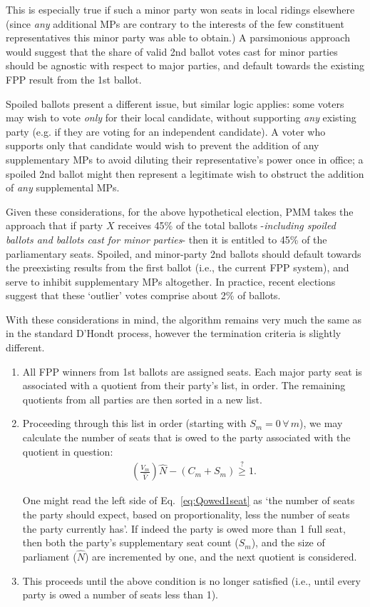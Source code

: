 This is especially true if such a minor party won seats in local ridings elsewhere (since \emph{any} additional MPs are contrary to the interests of the few constituent representatives this minor party was able to obtain.) 
A parsimonious approach would suggest that the share of valid 2nd ballot votes cast for minor parties should be agnostic with respect to major parties, and default towards the existing FPP result from the 1st ballot. 

Spoiled ballots present a different issue, but similar logic applies: some voters may wish to vote \emph{only} for their local candidate, without supporting \emph{any} existing party (e.g. if they are voting for an independent candidate). 
A voter who supports only that candidate would wish to prevent the addition of any supplementary MPs to avoid diluting their representative's power once in office; a spoiled 2nd ballot might then represent a legitimate wish to obstruct the addition of \emph{any} supplemental MPs.

Given these considerations, for the above hypothetical election, PMM takes the approach that if party $X$ receives 45\% of the total ballots \--\emph{including spoiled ballots and ballots cast for minor parties}\-- then it is entitled to 45\% of the parliamentary seats. 
Spoiled, and minor-party 2nd ballots should default towards the preexisting results from the first ballot (i.e., the current FPP system), and serve to inhibit supplementary MPs altogether. 
In practice, recent elections suggest that these `outlier' votes comprise about 2\% of ballots.

With these considerations in mind, the algorithm remains very much the same as in the standard D'Hondt process, however the termination criteria is slightly different.

\begin{enumerate}
\item All FPP winners from 1st ballots are assigned seats. 
Each major party seat is associated with a quotient from their party's list, in order. The remaining quotients from all parties are then sorted in a new list.

\item Proceeding through this list in order (starting with $S_m=0 \, \forall \, m$), we may calculate the number of seats that is owed to the party associated with the quotient in question:
\begin{align}
\left(\frac{V_m}{\hat{V}}\right) \hat{N} -(C_m+S_m)\stackrel{?}{\ge} 1.
\label{eq:Qowed1seat}
\end{align} 

One might read the left side of Eq.~\ref{eq:Qowed1seat} as `the number of seats the party should expect, based on proportionality, less the number of seats the party currently has'.
If indeed the party is owed more than 1 full seat, then both the party's supplementary seat count ($S_m$), and the size of parliament ($\hat{N}$) are incremented by one, and the next quotient is considered. 

\item This proceeds until the above condition is no longer satisfied (i.e., until every party is owed a number of seats less than 1). 
\end{enumerate}

